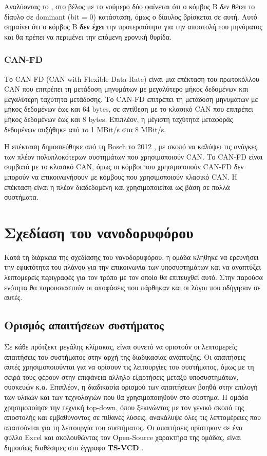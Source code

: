 \documentclass[a4paper,nobib,justified]{tufte-book}
\begin{document}
\FloatBarrier

Αναλύοντας το , στο βέλος με το νούμερο δύο φαίνεται ότι ο κόμβος B \emph{δεν} θέτει το δίαυλο σε dominant (bit = 0) κατάσταση, όμως ο δίαυλος βρίσκεται σε αυτή. Αυτό σημαίνει ότι ο κόμβος B \textbf{δεν έχει} την προτεραιότητα για την αποστολή του μηνύματος και θα πρέπει να περιμένει την επόμενη χρονική θυρίδα.

\subsection{CAN-FD}
Το CAN-FD (CAN with Flexible Data-Rate) είναι μια επέκταση του πρωτοκόλλου CAN που επιτρέπει τη μετάδοση μηνυμάτων με μεγαλύτερο μήκος δεδομένων και μεγαλύτερη ταχύτητα μετάδοσης. Το CAN-FD επιτρέπει τη μετάδοση μηνυμάτων με μήκος δεδομένων έως και 64 bytes, σε αντίθεση με το κλασικό CAN που επιτρέπει μήκος δεδομένων έως και 8 bytes. Επιπλέον, η μέγιστη ταχύτητα μεταφοράς δεδομένων αυξήθηκε από τo 1 MBit/s στα 8 MBit/s.


Η επέκταση δημοσιεύθηκε από τη Bosch το 2012 , με σκοπό να καλύψει τις ανάγκες των πλέον πολυπλοκότερων συστημάτων που χρησιμοποιούν CAN. Το CAN-FD είναι συμβατό με το κλασικό CAN, όμως οι κόμβοι που χρησιμοποιούν CAN-FD δεν μπορούν να επικοινωνήσουν με κόμβους που χρησιμοποιούν κλασικό CAN. Η επέκταση είναι η πλέον διαδεδομένη και χρησιμοποιείται ως βάση σε πολλά συστήματα.

\chapter{Σχεδίαση του νανοδορυφόρου}
\label{chap:design-choices}
Κατά τη διάρκεια της σχεδίασης του νανοδορυφόρου, η ομάδα κλήθηκε να ερευνήσει την εφικτότητα του πλάνου για την επικοινωνία των υποσυστημάτων και να αναπτύξει λεπτομερείς περιγραφές για τον τρόπο με τον οποίο θα επιτευχθεί αυτό. Στην παρούσα ενότητα θα παρουσιαστούν οι αποφάσεις που πάρθηκαν και οι λόγοι που οδήγησαν σε αυτές.

\section{Ορισμός απαιτήσεων συστήματος}
Σε κάθε πρότζεκτ μεγάλης κλίμακας, είναι συνετό να οριστούν οι λεπτομερείς απαιτήσεις του συστήματος στην αρχή της διαδικασίας ανάπτυξης. Οι απαιτήσεις αυτές χρησιμοποιούνται για να ορίσουν τις λειτουργίες του συστήματος, όμως με τη σειρά τους φέρουν στην επιφάνεια αλληλο-εξαρτήσεις μεταξύ υποσυστημάτων, συσκευών κ.α. Επιπλέον, η διαδικασία ορισμού των απαιτήσεων βοηθά στην επιλογή των υλικών και των τεχνολογιών που θα χρησιμοποιηθούν στο σύστημα. Η ομάδα χρησιμοποίησε την τεχνική top-down, όπου ξεκινώντας με τον γενικό σκοπό της αποστολής και εμβαθύνοντας σε πιθανές λύσεις, ανακάλυψε όλες τις λεπτομέρειες που απαιτούνται για τη λειτουργία του συστήματος. Οι απαιτήσεις ορίστηκαν σε ένα φύλλο Excel και ακολουθώντας τον Open-Source χαρακτήρα της ομάδας, είναι δημοσίως διαθέσιμες στο έγγραφο \textbf{TS-VCD} .
\end{document}

